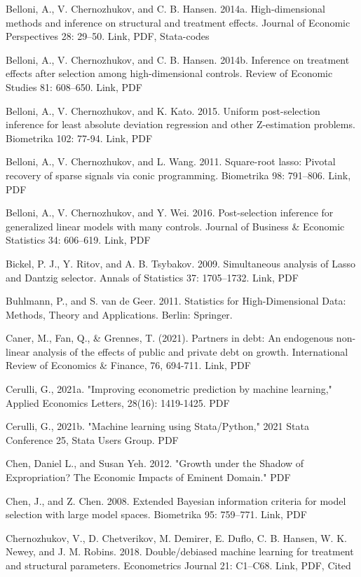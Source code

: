 {Belloni, A., V. Chernozhukov, and C. B. Hansen. 2014a. High-dimensional methods and inference on structural and
treatment effects. Journal of Economic Perspectives 28: 29–50. Link, PDF, Stata-codes

Belloni, A., V. Chernozhukov, and C. B. Hansen. 2014b. Inference on treatment effects after selection among high-dimensional controls. Review of Economic Studies 81: 608–650. Link, PDF

Belloni, A., V. Chernozhukov, and K. Kato. 2015. Uniform post-selection inference for least absolute deviation regression and other Z-estimation problems. Biometrika 102: 77-94. Link, PDF

Belloni, A., V. Chernozhukov, and L. Wang. 2011. Square-root lasso: Pivotal recovery of sparse signals via conic programming. Biometrika 98: 791–806. Link, PDF

Belloni, A., V. Chernozhukov, and Y. Wei. 2016. Post-selection inference for generalized linear models with many controls. Journal of Business \& Economic Statistics 34: 606–619.  Link, PDF


Bickel, P. J., Y. Ritov, and A. B. Tsybakov. 2009. Simultaneous analysis of Lasso and Dantzig selector. Annals of
Statistics 37: 1705–1732. Link, PDF

Buhlmann, P., and S. van de Geer. 2011. Statistics for High-Dimensional Data: Methods, Theory and Applications.
Berlin: Springer.

Caner, M., Fan, Q., \& Grennes, T. (2021). Partners in debt: An endogenous non-linear analysis of the effects of public and private debt on growth. International Review of Economics \& Finance, 76, 694-711. Link, PDF

Cerulli, G., 2021a. "Improving econometric prediction by machine learning," Applied Economics Letters, 28(16): 1419-1425. PDF

Cerulli, G., 2021b. "Machine learning using Stata/Python," 2021 Stata Conference 25, Stata Users Group. PDF

Chen, Daniel L., and Susan Yeh. 2012. "Growth under the Shadow of Expropriation? The Economic Impacts of Eminent Domain." PDF

Chen, J., and Z. Chen. 2008. Extended Bayesian information criteria for model selection
with large model spaces. Biometrika 95: 759–771. Link, PDF

Chernozhukov, V., D. Chetverikov, M. Demirer, E. Duflo, C. B. Hansen, W. K. Newey, and J. M. Robins. 2018.
Double/debiased machine learning for treatment and structural parameters. Econometrics Journal 21: C1–C68.
Link, PDF, Cited

}
